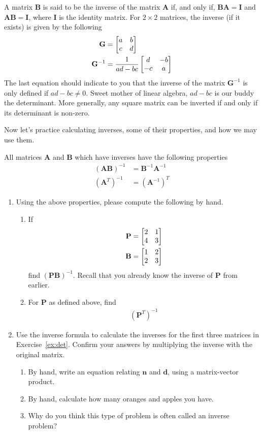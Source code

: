 A matrix $\mathbf{B}$ is said to be the inverse of the matrix $\mathbf{A}$ if, and only if, $\mathbf{BA} = \mathbf{I}$ and $\mathbf{AB} = \mathbf{I}$, where $\mathbf{I}$ is the identity matrix.
For $2 \times 2$ matrices, the inverse (if it exists) is given by the following
\begin{align}
\mathbf{G} &= \begin{bmatrix} a & b \\ c & d\end{bmatrix}\\
\mathbf{G}^{-1} &= \frac{1}{ad-bc}\begin{bmatrix} d & -b \\ -c & a\end{bmatrix}
\end{align}
The last equation should indicate to you that the inverse of the matrix $\mathbf{G}^{-1}$ is only defined if $ad-bc\neq 0$. Sweet mother of linear algebra, $ad-bc$ is our buddy the determinant. More generally, any square matrix can be inverted if and only if its determinant is non-zero.

Now let's practice calculating inverses, some of their properties, and how we may use them.

\begin{prob}
All matrices $\mathbf{A}$ and $\mathbf{B}$ which have inverses have the following properties
\begin{align}
(\mathbf{AB})^{-1} &= \mathbf{B}^{-1}\mathbf{A}^{-1} \nonumber\\
(\mathbf{A}^{T})^{-1} &= (\mathbf{A}^{-1})^{T} \nonumber
\end{align}
\begin{enumerate}
    \item Using the above properties, please compute the following by hand.
\begin{enumerate}
\item If
\begin{align}
\mathbf{P} &= \begin{bmatrix} 2 & 1 \\ 4 & 3\end{bmatrix}\\
\mathbf{B} &= \begin{bmatrix} 1 & 2 \\ 2 & 3\end{bmatrix}\\
\end{align}
find $(\mathbf{PB})^{-1}$. Recall that you already know the inverse of $\mathbf{P}$ from earlier.
\item For $\mathbf{P}$ as defined above, find
\begin{align}
(\mathbf{P}^T)^{-1}
\end{align}
\end{enumerate}

\item Use the inverse formula to calculate the inverses for the first three matrices in Exercise~\ref{ex:det}. Confirm your answers by multiplying the inverse with the original matrix.

\begin{enumerate}
\item By hand, write an equation relating $\mathbf{n}$ and $\mathbf{d}$, using a matrix-vector product.
\item By hand, calculate how many oranges and apples you have.
\item Why do you think this type of problem is often called an inverse problem?
\end{enumerate}
\end{enumerate}
\end{prob}

